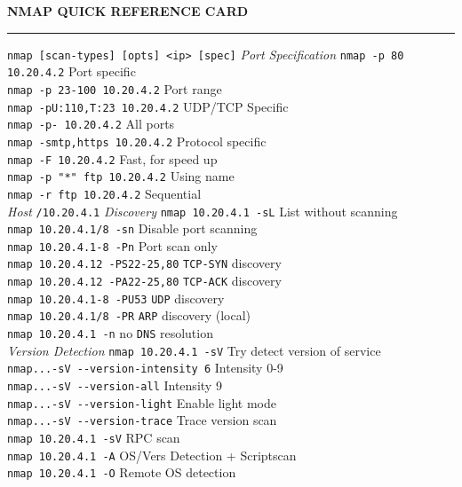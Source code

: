 \documentclass[a4paper,10pt]{article}
\begin{document}
\begin{multicols}{3} %

\begin{center}
    \textbf{NMAP QUICK REFERENCE CARD}
    \vskip-5pt
    \par\noindent\hrule
\end{center}
\vskip10pt
\verb|nmap [scan-types] [opts] <ip> [spec]|
\vskip10pt
\textit{Port Specification}
\vskip-5pt
\verb|nmap -p 80 10.20.4.2| \dotfill Port specific\\
\verb|nmap -p 23-100 10.20.4.2| \dotfill Port range\\
\verb|nmap -pU:110,T:23 10.20.4.2| \dotfill UDP/TCP Specific\\
\verb|nmap -p- 10.20.4.2| \dotfill All ports\\
\verb|nmap -smtp,https 10.20.4.2| \dotfill Protocol specific\\
\verb|nmap -F 10.20.4.2| \dotfill Fast, for speed up\\
\verb|nmap -p "*" ftp 10.20.4.2| \dotfill Using name\\
\verb|nmap -r ftp 10.20.4.2| \dotfill Sequential\\

\textit{Host} \verb|/10.20.4.1| \textit{Discovery}
\vskip-5pt
\verb|nmap 10.20.4.1 -sL| \dotfill List without scanning\\
\verb|nmap 10.20.4.1/8 -sn| \dotfill Disable port scanning\\
\verb|nmap 10.20.4.1-8 -Pn| \dotfill Port scan only\\
\verb|nmap 10.20.4.12 -PS22-25,80| \dotfill \verb|TCP-SYN| discovery\\
\verb|nmap 10.20.4.12 -PA22-25,80| \dotfill \verb|TCP-ACK| discovery\\
\verb|nmap 10.20.4.1-8 -PU53| \dotfill \verb|UDP| discovery\\
\verb|nmap 10.20.4.1/8 -PR| \dotfill \verb|ARP| discovery (local)\\
\verb|nmap 10.20.4.1 -n| \dotfill no \verb|DNS| resolution\\

\textit{Version Detection}
\vskip-5pt
\verb|nmap 10.20.4.1 -sV| \dotfill Try detect version of service\\
\verb|nmap...-sV --version-intensity 6| \dotfill Intensity 0-9\\
\verb|nmap...-sV --version-all| \dotfill Intensity 9\\
\verb|nmap...-sV --version-light| \dotfill Enable light mode\\
\verb|nmap...-sV --version-trace| \dotfill Trace version scan\\
\verb|nmap 10.20.4.1 -sV| \dotfill RPC scan\\
\verb|nmap 10.20.4.1 -A| \dotfill OS/Vers Detection + Scriptscan\\
\verb|nmap 10.20.4.1 -O| \dotfill Remote OS detection\\


\end{multicols}
\end{document}
